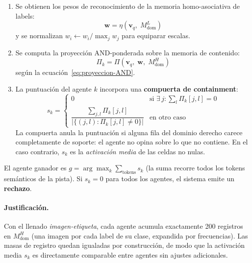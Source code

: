 \begin{enumerate}
    \item Se obtienen los pesos de reconocimiento de la memoria homo-asociativa de labels:
    \begin{equation}
        \mathbf{w} = \eta(\mathbf{v}_q,\; M^L_{\mathrm{dom}})
        \label{eq:pesos-routing}
    \end{equation}
    y se normalizan $w_i \leftarrow w_i / \max_j w_j$ para equiparar escalas.

    \item Se computa la proyección AND-ponderada sobre la memoria de contenido:
    \begin{equation}
        \Pi_k = \Pi(\mathbf{v}_q,\; \mathbf{w},\; M^H_{\mathrm{dom}})
        \label{eq:proyeccion-routing}
    \end{equation}
    según la ecuación~\eqref{eq:proyeccion-AND}.

    \item La puntuación del agente $k$ incorpora una \textbf{compuerta de containment}:
    \begin{equation}
        s_k = \begin{cases}
            0 & \text{si } \exists\, j : \sum_l \Pi_k[j, l] = 0 \\[4pt]
            \dfrac{\displaystyle\sum_{j,l} \Pi_k[j, l]}%
                  {|\{(j,l) : \Pi_k[j,l] \neq 0\}|} & \text{en otro caso}
        \end{cases}
        \label{eq:score-gated}
    \end{equation}
    La compuerta anula la puntuación si alguna fila del dominio derecho carece completamente
    de soporte: el agente no opina sobre lo que no contiene.
    En el caso contrario, $s_k$ es la \emph{activación media} de las celdas no nulas.
\end{enumerate}

El agente ganador es $g = \arg\max_k \sum_{\text{tokens}} s_k$ (la suma recorre todos
los tokens semánticos de la pista).
Si $s_k = 0$ para todos los agentes, el sistema emite un \textbf{rechazo}.

\paragraph{Justificación.}
Con el llenado \emph{imagen-etiqueta}, cada agente acumula exactamente 200 registros en
$M^H_{\mathrm{dom}}$ (una imagen por cada label de su clase, expandida por frecuencias).
Las masas de registro quedan igualadas por construcción, de modo que la activación media
$s_k$ es directamente comparable entre agentes sin ajustes adicionales.

